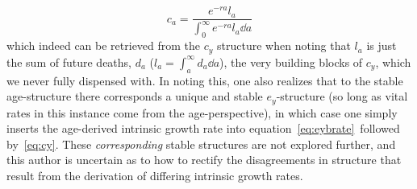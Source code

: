 \begin{equation}
c_a = \frac{e^{-ra}l_a}{\int _0 ^\infty e^{-ra}l_a \dd a}
\end{equation}
which indeed can be retrieved from the $c_y$ structure when noting that $l_a$ is
just the sum of future deaths, $d_a$ ($l_a = \int _a ^\infty d_a \dd a$), the
very building blocks of $c_y$, which we never fully dispensed with. In noting
this, one also realizes that to the stable age-structure there corresponds a
unique and stable $e_y$-structure (so long as vital rates in this instance come
from the age-perspective), in which case one simply inserts the age-derived intrinsic
growth rate into equation~\eqref{eq:eybrate}~followed by~\eqref{eq:cy}. These
\textit{corresponding} stable structures are not explored further, and this
author is uncertain as to how to rectify the disagreements in structure that
result from the derivation of differing intrinsic growth rates.

 \FloatBarrier
